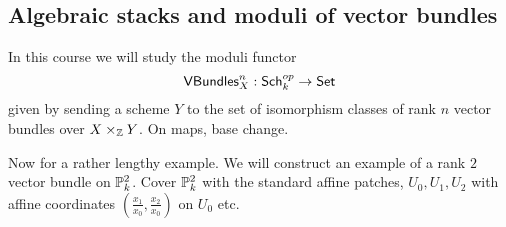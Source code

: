\documentclass[11pt, english]{article}
\begin{document}
\subsection{Algebraic stacks and moduli of vector bundles}
\label{subsec:vb}

In this course we will study the moduli functor
\[
\mathsf{VBundles}_X^n: \mathsf{Sch}_{k}^{op} \to \mathsf{Set}
\]
given by sending a scheme $Y$ to the set of isomorphism classes of rank $n$ vector bundles over $X \times_{\mathbb{Z}} Y$. On maps, base change.

\begin{example}
Now for a rather lengthy example. We will construct an example of a rank $2$ vector bundle on $\mathbb{P}_k^2$. Cover $\mathbb{P}_k^2$ with the standard affine patches, $U_0,U_1, U_2$ with affine coordinates $(\frac{x_1}{x_0},\frac{x_2}{x_0})$ on $U_0$ etc.


\end{example}
\end{document}
